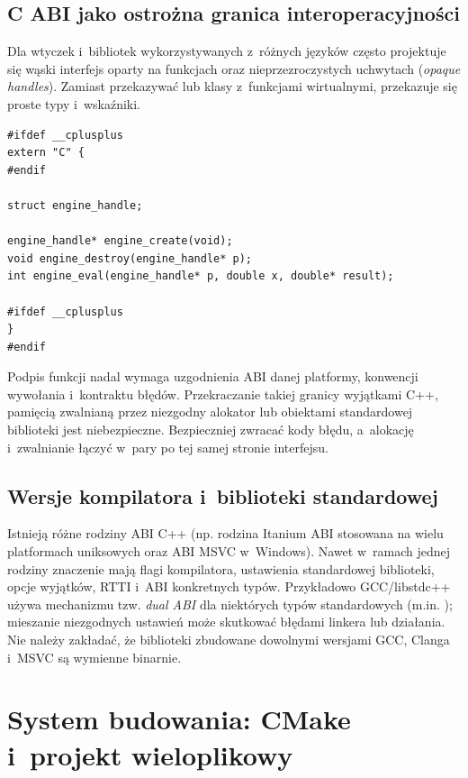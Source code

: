 \subsection{C ABI jako ostrożna granica interoperacyjności}

Dla wtyczek i~bibliotek wykorzystywanych z~różnych języków często
projektuje się wąski interfejs oparty na funkcjach 
oraz nieprzezroczystych uchwytach (\emph{opaque handles}). Zamiast
przekazywać  lub klasy z~funkcjami wirtualnymi,
przekazuje się proste typy i~wskaźniki.

\begin{lstlisting}[caption={Przykładowy szkic stabilniejszego interfejsu binarnego.}]
#ifdef __cplusplus
extern "C" {
#endif

struct engine_handle;

engine_handle* engine_create(void);
void engine_destroy(engine_handle* p);
int engine_eval(engine_handle* p, double x, double* result);

#ifdef __cplusplus
}
#endif
\end{lstlisting}

Podpis funkcji nadal wymaga uzgodnienia ABI danej platformy,
konwencji wywołania i~kontraktu błędów. Przekraczanie takiej granicy
wyjątkami C++, pamięcią zwalnianą przez niezgodny alokator lub obiektami
standardowej biblioteki jest niebezpieczne. Bezpieczniej zwracać
kody błędu, a~alokację i~zwalnianie łączyć w~pary po tej samej
stronie interfejsu.

\subsection{Wersje kompilatora i~biblioteki standardowej}

Istnieją różne rodziny ABI C++ (np. rodzina Itanium ABI stosowana na
wielu platformach uniksowych oraz ABI MSVC w~Windows). Nawet w~ramach
jednej rodziny znaczenie mają flagi kompilatora, ustawienia standardowej
biblioteki, opcje wyjątków, RTTI i~ABI konkretnych typów.
Przykładowo GCC/libstdc++ używa mechanizmu tzw. \emph{dual ABI}
dla niektórych typów standardowych (m.in. ); mieszanie
niezgodnych ustawień może skutkować błędami linkera lub działania.
Nie należy zakładać, że biblioteki zbudowane dowolnymi wersjami
GCC, Clanga i~MSVC są wymienne binarnie.

\section{System budowania: CMake i~projekt wieloplikowy}
\label{sec:cpp17-cmake}


